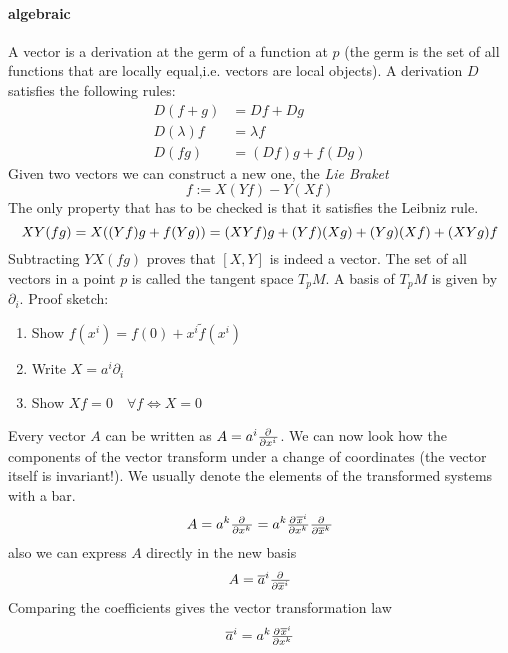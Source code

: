 \documentclass[
    a4paper,                                               %
    oneside,                                               %
    12pt,                                                  %
    headsepline,                                           %
    xcolor=dvipsnames
    ]{scrreprt}
\theoremstyle{definition}
\theoremstyle{remark}
\begin{document}
	     \paragraph{algebraic}
	     A vector is a derivation at the germ of a function at $p$ (the germ is the set of all functions that are locally equal,i.e. vectors are local objects). A derivation $D$ satisfies the following rules:
	     \begin{align*}
	     	D(f+g) &=Df+Dg\\
	     	D(\lambda)f&=\lambda f\\
	     	D(fg)&= (Df)g+f(Dg)
	     \end{align*}
	     Given two vectors we can construct a new one, the \emph{Lie Braket}
	     \begin{equation}
	     	[X,Y]f:=X(Yf)-Y(Xf)
	     \end{equation}
	     The only property that has to be checked is that it satisfies the Leibniz rule.
	     \begin{equation*}
	     	XY(fg)=X((Yf)g+f(Yg))=(XYf)g+(Yf)(Xg)+(Yg)(Xf)+(XYg)f\\
	     \end{equation*}
	     Subtracting $YX(fg)$ proves that $[X,Y]$ is indeed a vector. 
	     The set of all vectors in a point $p$ is called the tangent space $T_pM$. A basis of $T_pM$ is given by $\partial_i$.
	     Proof sketch:
	     \begin{enumerate}
	     	\item Show $f(x^i)=f(0)+x^i\tilde{f}(x^i)$
	     	\item Write $X=a^i\partial_i$
	     	\item Show $Xf=0\quad \forall f \iff X=0$
	     \end{enumerate}
	     Every vector $A$ can be written as $A=a^i\pd{}{{x^i}}$. We can now look how the components of the vector transform under a change of coordinates (the vector itself is invariant!). We usually denote the elements of the transformed systems with a bar.
	     \begin{equation}
	     	A= a^k\pd{}{{x^k}}= a^k\pd{\overline{x}^i}{{x^k}}\pd{}{{\overline{x}^k}}
	     \end{equation}
	     also we can express $A$ directly in the new basis
	     \begin{equation}
	     A= \overline{a}^i\pd{}{{\overline{x}^i}}
	     \end{equation}
	     Comparing the coefficients gives the vector transformation law
	     \begin{equation}
	     	\overline{a}^i=a^k\pd{\overline{x}^i}{{x^k}}\label{eq:coefftrafo}
	     \end{equation}
\end{document}
